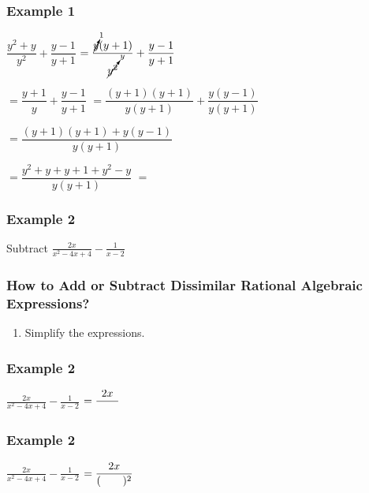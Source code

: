 \documentclass[14pt]{beamer}
\begin{document}
    \begin{frame}
    	\frametitle{Example 1}
    	$\dfrac{y^2+y}{y^2} + \dfrac{y-1}{y+1}$
    	$ = \dfrac{\cancelto{1}{y} (y + 1) }{\cancelto{y}{y^2}} + \dfrac{y-1}{y+1}$
    	
    	\vspace{1em}\hspace{1em} $ = \dfrac{y+1}{y} + \dfrac{y-1}{y+1} $
    	$ = \dfrac{(y+1) (y+1)}{y(y+1)} + \dfrac{y (y - 1)}{y (y + 1)}$
    	
    	\vspace{1em}\hspace{1em} $ = \dfrac{ (y+1)(y+1) + y(y - 1) }{y(y+1)} $
    	
    	\vspace{1em}\hspace{1em} $ = \dfrac{y^2 + y + y + 1 + y^2 -y}{ y(y + 1)} $
    	$ = $  \redcheck
    \end{frame}

    \begin{frame}
    	\frametitle{Example 2}
    	Subtract $\displaystyle \frac{2x}{x^2-4x+4} - \frac{1}{x-2}$
    \end{frame}

    \begin{frame}
    	\frametitle{How to Add or Subtract Dissimilar Rational Algebraic Expressions?}
    	\begin{enumerate}
    		\item Simplify the expressions.
    	\end{enumerate}
    \end{frame}

    \begin{frame}
    	\frametitle{Example 2}
    	$\displaystyle \frac{2x}{x^2-4x+4} - \frac{1}{x-2}$
    	\pause $ = \displaystyle \frac{2x}{\text{\hspace{2em}}}$
    	
    \end{frame}

    \begin{frame}
    	\frametitle{Example 2}
    	$\displaystyle \frac{2x}{x^2-4x+4} - \frac{1}{x-2}$
    	$ = \displaystyle \frac{2x}{(\text{\hspace{2em}})^2}$
    \end{frame}
\end{document}
